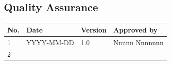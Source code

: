\documentclass{article}
\begin{document}
\subsection[Quality Assurance]{Quality Assurance}
\begin{flushleft}
\tablefirsthead{}
\tablehead{}
\tabletail{}
\tablelasttail{}
\begin{supertabular}{|m{0.38865986in}|m{1.2011598in}|m{0.5559598in}|m{1.5656599in}|}
\hline
{ No.} &
{ Date} &
{ Version} &
{ Approved by}\\\hline
{ 1} &
{ YYYY-MM-DD} &
{ 1.0} &
{ Nnnnn Nnnnnnn}\\\hline
{ 2} &
 &
 &
\\\hline
\end{supertabular}
\end{flushleft}
\end{document}

